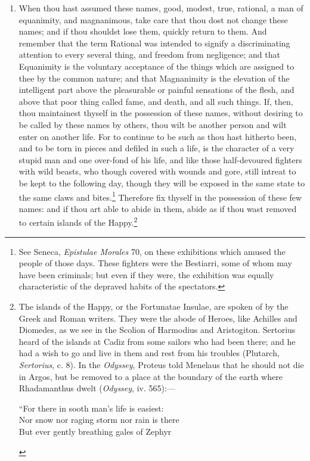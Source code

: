 \begin{enumerate}
\item When thou hast assumed these names, good, modest, true, rational, a man of equanimity, and magnanimous, take care that thou dost not change these names; and if thou shouldst lose them, quickly return to them. And remember that the term Rational was intended to signify a discriminating attention to every several thing, and freedom from negligence; and that Equanimity is the voluntary acceptance of the things which are assigned to thee by the common nature; and that Magnanimity is the elevation of the intelligent part above the pleasurable or painful sensations of the flesh, and above that poor thing called fame, and death, and all such things. If, then, thou maintainest thyself in the possession of these names, without desiring to be called by these names by others, thou wilt be another person and wilt enter on another life. For to continue to be such as thou hast hitherto been, and to be torn in pieces and defiled in such a life, is the character of a very stupid man and one over-fond of his life, and like those half-devoured fighters with wild beasts, who though covered with wounds and gore, still intreat to be kept to the following day, though they will be exposed in the same state to the same claws and bites.\footnote{See Seneca, \textit{Epistulae Morales} 70, on these exhibitions which amused the people of those days. These fighters were the Bestiarri, some of whom may have been criminals; but even if they were, the exhibition was equally characteristic of the depraved habits of the spectators.} Therefore fix thyself in the possession of these few names: and if thou art able to abide in them, abide as if thou wast removed to certain islands of the Happy.\footnote{The islands of the Happy, or the Fortunatae Insulae, are spoken of by the Greek and Roman writers. They were the abode of Heroes, like Achilles and Diomedes, as we see in the Scolion of Harmodius and Aristogiton. Sertorius heard of the islands at Cadiz from some sailors who had been there; and he had a wish to go and live in them and rest from his troubles (Plutarch, \textit{Sertorius}, c. 8). In the \textit{Odyssey}, Proteus told Menelaus that he should not die in Argos, but be removed to a place at the boundary of the earth where Rhadamanthus dwelt (\textit{Odyssey}, iv. 565):—
\begin{displayquote}
	``For there in sooth man's life is easiest:	\\
	Nor snow nor raging storm nor rain is there	\\
	But ever gently breathing gales of Zephyr	\\

\end{displayquote}}
\end{enumerate}
